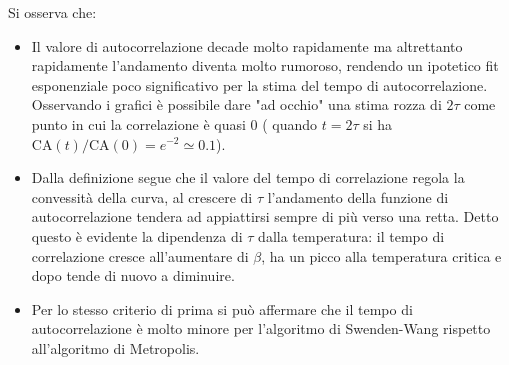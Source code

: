 Si osserva che:
\begin{itemize}
\item Il valore di autocorrelazione decade molto rapidamente ma altrettanto rapidamente l'andamento diventa molto rumoroso, rendendo un ipotetico fit esponenziale poco significativo per la stima del tempo di autocorrelazione.
Osservando i grafici è possibile dare "ad occhio" una stima rozza di $2\tau$ come punto in cui la correlazione è quasi 0 ( quando $t=2\tau$ si ha  $\textrm{CA}(t)/\textrm{CA}(0)= e^{-2} \simeq 0.1$).

\item Dalla definizione segue che il valore del tempo di correlazione regola la convessità della curva, al crescere di $\tau$ l'andamento della funzione di autocorrelazione tendera ad appiattirsi sempre di più verso una retta.
Detto questo è evidente la dipendenza di $\tau$ dalla temperatura: il tempo di correlazione cresce all'aumentare di $\beta$, ha un picco alla temperatura critica e dopo tende di nuovo a diminuire.

\item Per lo stesso criterio di prima si può affermare che il tempo di autocorrelazione è molto minore per l'algoritmo di Swenden-Wang rispetto all'algoritmo di Metropolis.
\end{itemize}

